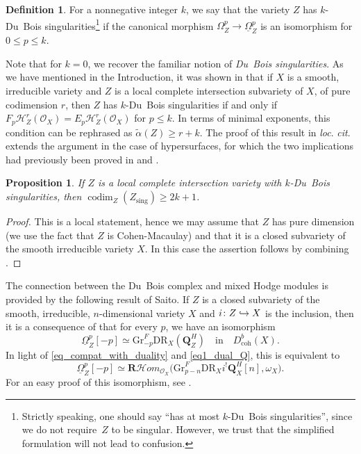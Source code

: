 \documentclass[JEP,XML,SOM,Unicode]{cedram}
\newcommand\hto{\mathrel{\lhook\joinrel\to}}
\theoremstyle{plain}
\newtheorem{prop}[thm]{Proposition}
\theoremstyle{definition}
\newtheorem{defi}[thm]{Definition}
\newcommand\Q{{\mathbf Q}}
\newcommand\R{{\mathbf R}}
\newcommand\cH{\mathcal{H}}
\newcommand\cO{\mathcal{O}}
\newcommand\cH{\mathcal{H}}
\newcommand\cO{\mathcal{O}}
\newcommand\gr{\mathrm{Gr}}
\newcommand\DR{\mathrm{DR}}
\newcommand\sing{\mathrm{sing}}
\DeclareMathOperator{\codim}{codim}
\begin{document}
\begin{defi}\label{defi_k_DuBois}
For a nonnegative integer $k$, we say that the variety $Z$ has $k$\nobreakdash-Du~Bois singularities\footnote{Strictly speaking, one should say ``has at most $k$-Du~Bois singularities'', since we do not require~$Z$ to be singular. However,
we trust that the simplified formulation will not lead to confusion.} if the canonical morphism $\Omega_Z^p\to \underline{\Omega}_Z^p$ is an isomorphism for $0\leq p\leq k$.
\end{defi}

Note that for $k=0$, we recover the familiar notion of \emph{Du~Bois singularities}.
As we have mentioned in the Introduction, it was shown in \cite[Th.\,F]{MP1} that if $X$ is a smooth, irreducible variety and $Z$ is a local complete intersection
subvariety of $X$, of pure codimension $r$, then $Z$ has $k$-Du~Bois singularities if and only if $F_p\cH^r_Z(\cO_X)=E_p\cH^r_Z(\cO_X)$ for $p\leq k$. In terms of minimal exponents,
this condition can be rephrased as $\widetilde{\alpha}(Z)\geq r+k$. The proof of this result in \emph{loc}. \emph{cit}. extends the argument in the case of hypersurfaces,
for which the two implications had previously been proved in
\cite{MOPW} and \cite{Saito_et_al}.

\begin{prop}\label{sing_locus_Du_Bois}
If $Z$ is a local complete intersection variety with $k$-Du~Bois singularities, then
$\codim_Z(Z_\sing)\geq 2k+1$.
\end{prop}

\begin{proof}
This is a local statement, hence we may assume that $Z$ has pure dimension (we use the fact that
$Z$ is Cohen-Macaulay) and that it is a closed subvariety of the smooth irreducible variety $X$. In this case the assertion follows by combining
\cite[Cor.\,3.40 and Th.\,F]{MP1}.
\end{proof}

The connection between the Du~Bois complex and mixed Hodge modules is provided by the following result of Saito. If $Z$ is a closed subvariety
of the smooth, irreducible, $n$-dimensional variety $X$ and $i\colon Z\hto X$ is the inclusion, then it is a consequence of
\cite[Th.\,4.2]{Saito-HC} that for every $p$, we have an isomorphism
\begin{equation}\label{eq_Saito_DuBois}
\underline{\Omega}_Z^p[-p]\simeq \gr^F_{-p}\DR_X(\Q_Z^H)\quad\text{in}\quad D^b_\mathrm{coh}(X).
\end{equation}
In light of \eqref{eq_compat_with_duality} and \eqref{eq1_dual_Q}, this is equivalent to
\begin{equation}\label{eq2_Saito_DuBois}
\underline{\Omega}_Z^p[-p]\simeq \R\cH om_{\cO_X}\big(\gr^F_{p-n}\DR_Xi^!\Q_X^H[n],\omega_X\big).
\end{equation}
For an easy proof of this isomorphism, see \cite[Prop.\,5.5]{MP1}.
\end{document}
